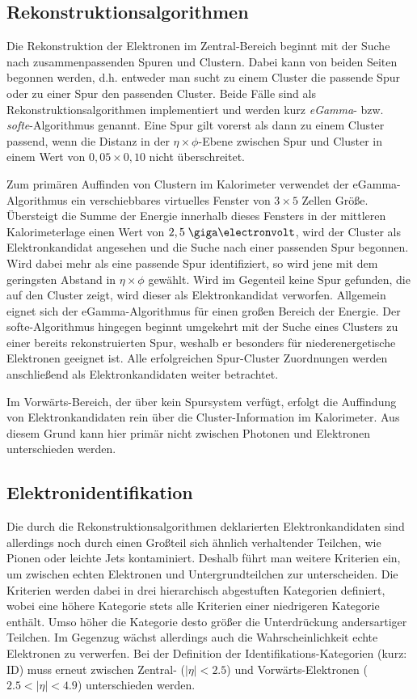 \subsection{Rekonstruktionsalgorithmen}
\label{reconstruction}
Die Rekonstruktion der Elektronen im Zentral-Bereich beginnt mit der Suche nach
zusammenpassenden Spuren und Clustern. Dabei kann von beiden Seiten begonnen
werden, d.h. entweder man sucht zu einem Cluster die passende Spur oder zu
einer Spur den passenden Cluster. Beide Fälle sind als
Rekonstruktionsalgorithmen implementiert und werden kurz \textit{eGamma}- bzw.
\textit{softe}-Algorithmus genannt. Eine Spur gilt vorerst als dann zu einem
Cluster passend, wenn die Distanz in der $\eta\times\phi$-Ebene zwischen Spur
und Cluster in einem Wert von $0,05\times0,10$ nicht überschreitet.

Zum primären Auffinden von Clustern im Kalorimeter verwendet der
eGamma-Algorithmus ein verschiebbares virtuelles Fenster von $3\times5$ Zellen
Größe. Übersteigt die Summe der Energie innerhalb dieses Fensters in der
mittleren Kalorimeterlage einen Wert von $2,5\GeV$, wird der Cluster als
Elektronkandidat angesehen und die Suche nach einer passenden Spur begonnen.
Wird dabei mehr als eine passende Spur identifiziert, so wird jene mit dem
geringsten Abstand in $\eta\times\phi$ gewählt. Wird im Gegenteil keine Spur
gefunden, die auf den Cluster zeigt, wird dieser als Elektronkandidat
verworfen. Allgemein eignet sich der eGamma-Algorithmus für einen großen
Bereich der Energie. Der softe-Algorithmus hingegen beginnt umgekehrt mit der
Suche eines Clusters zu einer bereits rekonstruierten Spur, weshalb er
besonders für niederenergetische Elektronen geeignet ist. Alle erfolgreichen
Spur-Cluster Zuordnungen werden anschließend als Elektronkandidaten weiter
betrachtet.

Im Vorwärts-Bereich, der über kein Spursystem verfügt, erfolgt die Auffindung
von Elektronkandidaten rein über die Cluster-Information im Kalorimeter. Aus
diesem Grund kann hier primär nicht zwischen Photonen und Elektronen
unterschieden werden.



\subsection{Elektronidentifikation}
\label{identification}
Die durch die Rekonstruktionsalgorithmen deklarierten Elektronkandidaten
sind allerdings noch durch einen Großteil sich ähnlich verhaltender Teilchen,
wie Pionen oder leichte Jets kontaminiert. Deshalb führt man weitere Kriterien
ein, um zwischen echten Elektronen und Untergrundteilchen zur unterscheiden.
Die Kriterien werden dabei in drei hierarchisch abgestuften Kategorien
definiert, wobei eine höhere Kategorie stets alle Kriterien einer niedrigeren
Kategorie enthält. Umso höher die Kategorie desto größer die Unterdrückung
andersartiger Teilchen. Im Gegenzug wächst allerdings auch die
Wahrscheinlichkeit echte Elektronen zu verwerfen. Bei der Definition der
Identifikations-Kategorien (kurz: \acs{ID}) muss erneut zwischen Zentral-
($|\eta|<2.5$) und Vorwärts-Elektronen ($2.5<|\eta|<4.9$) unterschieden werden.

